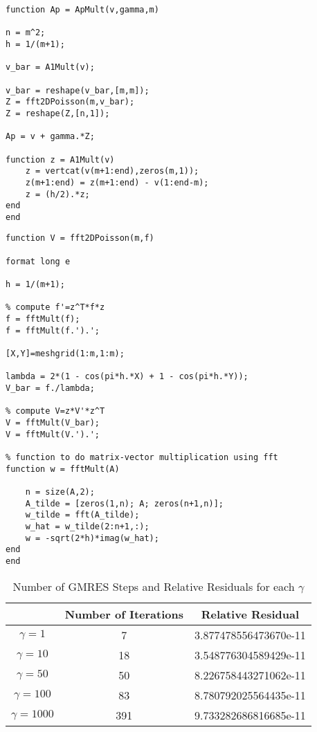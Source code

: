 \documentclass[12pt]{article}
\begin{document}
\lstset{language=matlab,frame=single}
\begin{lstlisting}[caption=Matlab Function to Perform Matrix-Vector Products with $A'$]
function Ap = ApMult(v,gamma,m)

n = m^2;
h = 1/(m+1);

v_bar = A1Mult(v);

v_bar = reshape(v_bar,[m,m]);
Z = fft2DPoisson(m,v_bar);
Z = reshape(Z,[n,1]);

Ap = v + gamma.*Z;

function z = A1Mult(v)
	z = vertcat(v(m+1:end),zeros(m,1));
	z(m+1:end) = z(m+1:end) - v(1:end-m);
    z = (h/2).*z;
end
end
\end{lstlisting}

\newpage
\lstset{language=matlab,frame=single}
\begin{lstlisting}[caption=Matlab Code for FFT-Based Solver]
function V = fft2DPoisson(m,f)

format long e

h = 1/(m+1);

% compute f'=z^T*f*z
f = fftMult(f);
f = fftMult(f.').';

[X,Y]=meshgrid(1:m,1:m);

lambda = 2*(1 - cos(pi*h.*X) + 1 - cos(pi*h.*Y));
V_bar = f./lambda;

% compute V=z*V'*z^T
V = fftMult(V_bar);
V = fftMult(V.').';

% function to do matrix-vector multiplication using fft
function w = fftMult(A)
        
	n = size(A,2);
    A_tilde = [zeros(1,n); A; zeros(n+1,n)];
    w_tilde = fft(A_tilde);
    w_hat = w_tilde(2:n+1,:);
    w = -sqrt(2*h)*imag(w_hat);
end
end
\end{lstlisting}



\begin{table}[H]
\centering
\renewcommand{\arraystretch}{1.3}
\begin{small}
\begin{tabular}{| c || c | c |}
\hline
 &  Number of Iterations & Relative Residual\\
\hline 
\hline
$\gamma = 1$ &  7 & 3.877478556473670e-11 \\
$\gamma = 10$ &  18 &  3.548776304589429e-11 \\
$\gamma = 50$ &  50 & 8.226758443271062e-11  \\
$\gamma = 100$ & 83  &  8.780792025564435e-11 \\
$\gamma = 1000$ & 391  &  9.733282686816685e-11 \\

\hline
\end{tabular}
\end{small}
\caption{Number of GMRES Steps and Relative Residuals for each $\gamma$}
\end{table} 
\end{document}
